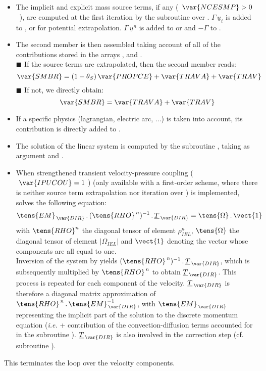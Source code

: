 \begin{itemize}
\item The implicit and explicit mass source terms, if any (~$\var{NCESMP}>0$~), are computed at the first iteration by the subroutine   over . $\Gamma\,\underline{u}_i$ is added to ,  or  for potential extrapolation. $\Gamma\,\underline{u}^n$ is added to  or  and
$-\Gamma$ to .
\\
\item The second member is then assembled taking account of all of the
contributions stored in the arrays ,  and
.\\
{\tiny$\blacksquare$} If the source terms are extrapolated, then the second member reads:
$$\var{SMBR}=(1-\theta_S)\,\var{PROPCE}+\var{TRAVA}+\var{TRAV}$$
{\tiny$\blacksquare$} If not, we directly obtain:
$$\var{SMBR}=\var{TRAVA}+\var{TRAV}$$

\item If a specific physics (lagrangian, electric arc, ...) is taken into account, its contribution is directly added to .
\\
\item The solution of the linear system is computed by the subroutine
, taking as argument  and .\\

\item When strengthened transient velocity-pressure coupling ($\ \var{IPUCOU} = 1\ $) (only available with a first-order scheme, where there is neither source term extrapolation nor iteration over ) is implemented,  solves the following equation:
\begin{equation}\label{Base_Predvv_Eq_Tdir}
\tens{EM}_{\,\var{DIR}}\,.\, (\tens{RHO}^{\,n})^{-1}\,.\,\underline{T}_{\,\var{DIR}} =
\tens{\Omega}\,.\,\vect{1}
\end{equation}
with $\tens{RHO}^n$ the diagonal tensor of element $\rho^{n}_{IEL}$,
$\tens{\Omega}$ the diagonal tensor of element $|\Omega_{IEL}|$ and $\vect{1}$ denoting the
vector whose components are all equal to one.\\
Inversion of the system by  yields
$(\tens{RHO}^{\,n})^{-1}\,.\,\underline{T}_{\,\var{DIR}}$, which is subsequently multiplied by $\tens{RHO}^{\,n}$
to obtain $\underline{T}_{\,\var{DIR}}$.
This process is repeated for each component  of the velocity. $\underline{T}_{\,\var{DIR}}$
is therefore a diagonal matrix approximation of
$\tens{RHO}^{\,n}\,.\,\tens{EM}_{\,\var{DIR}}^{-1}$, with
$\tens{EM}_{\,\var{DIR}}$ representing the implicit part of the solution to the discrete momentum equation (\emph{i.e.}  + contribution of the convection-diffusion terms accounted for in the subroutine
). $\underline{T}_{\,\var{DIR}}$ is also involved in the correction step (cf. subroutine ).\\
\end{itemize}
This terminates the loop over the velocity components.\\

